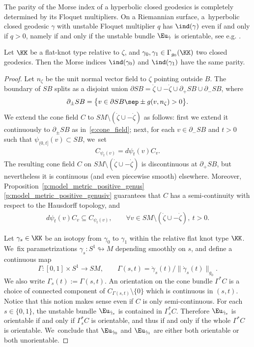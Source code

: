 The parity of the Morse index of a hyperbolic closed geodesics is completely determined by its Floquet multipliers. On a Riemannian surface, a~hyperbolic closed geodesic $\gamma$ with unstable Floquet multiplier $q$ has $\ind(\gamma)$ even if and only if $q>0$, namely if and only if the unstable bundle $\Eu_{\dot\gamma}$ is orientable, see e.g. \cite[Cor.\,3.6]{Wilking:2001aa}.

\begin{Lemma}\label{l:same_parity}
Let $\KK$ be a flat-knot type relative to $\zeta$, and $\gamma_0,\gamma_1\in\Gamma_{g_0}(\KK)$ two closed geodesics. Then the Morse indices $\ind(\gamma_0)$ and $\ind(\gamma_1)$ have the same parity.
\end{Lemma}

\begin{proof}
Let $n_\zeta$ be the unit normal vector field to $\zeta$ pointing outside $B$.
The boundary of $SB$ splits as a disjoint union $\partial SB=\dot\zeta\cup-\dot\zeta\cup\partial_+SB\cup\partial_-SB$, where
\begin{align*}
\partial_\pm SB
=
\big\{ v\in\partial SB\sep \pm g(v,n_\zeta)>0 \big\}.
\end{align*}
We extend the cone field $C$ to $SM\setminus(\dot\zeta\cup-\dot\zeta)$ as follows: first we extend it continuously to $\partial_\pm SB $ as in~\eqref{e:cone_field}; next, for each $v\in\partial_-SB$ and $t>0$ such that $\psi_{(0,t]}(v)\subset SB$, we~set
\begin{align*}
C_{\psi_t(v)} = d\psi_t(v)C_v.
\end{align*}
The resulting cone field $C$ on $SM\setminus(\dot\zeta\cup-\dot\zeta)$ is discontinuous at $\partial_+SB$, but nevertheless it is continuous (and even piecewise smooth) elsewhere. Moreover, Proposition~\ref{p:model_metric_positive_genus}\eqref{p:model_metric_positive_genusiv} guarantees that $C$ has a semi-continuity with respect to the Hausdorff topology, and
\begin{align*}
d\psi_t(v)C_v\subseteq C_{\psi_t(v)},
\qquad \forall v\in SM\setminus(\dot\zeta\cup-\dot\zeta),\ t>0.
\end{align*}

Let $\gamma_s\in\KK$ be an isotopy from $\gamma_0$ to $\gamma_1$ within the relative flat knot type $\KK$. We~fix parametrizations $\gamma_s:S^1\looparrowright M$ depending smoothly on $s$, and define a continuous map
\[
 \Gamma:[0,1]\times S^1\to SM,\qquad \Gamma(s,t)=\dot\gamma_s(t)/\|\dot\gamma_s(t)\|_{g_0}.
\]
We also write $\Gamma_s(t):=\Gamma(s,t)$.
An orientation on the cone bundle $\Gamma^*C$ is a choice of connected component of $C_{\Gamma(s,t)}\setminus\{0\}$ which is continuous in $(s,t)$. Notice that this notion makes sense even if $C$ is only semi-continuous. For each $s\in\{0,1\}$, the unstable bundle $\Eu_{\dot\gamma_s}$ is contained in $\Gamma_s^*C$. Therefore $\Eu_{\dot\gamma_s}$ is orientable if and only if $\Gamma_s^*C$ is orientable, and thus if and only if the whole $\Gamma^*C$ is orientable. We~conclude that $\Eu_{\dot\gamma_0}$ and $\Eu_{\dot\gamma_1}$ are either both orientable or both unorientable.
\end{proof}

